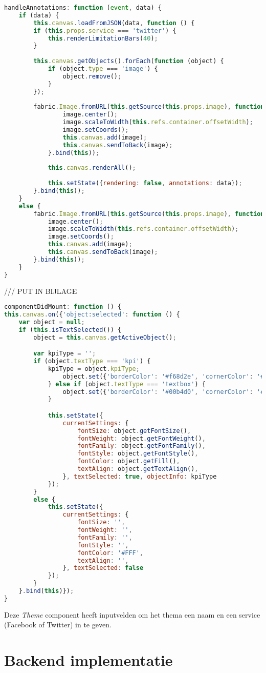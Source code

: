 \begin{lstlisting}[language=javascript]
handleAnnotations: function (event, data) {
	if (data) {
		this.canvas.loadFromJSON(data, function () {
		if (this.props.service === 'twitter') {
			this.renderLimitationBars(40);
		}
		
		this.canvas.getObjects().forEach(function (object) {
			if (object.type === 'image') {
				object.remove();
			}
		});
		
		fabric.Image.fromURL(this.getSource(this.props.image), function (image) {
				image.center();
				image.scaleToWidth(this.refs.container.offsetWidth);
				image.setCoords();
				this.canvas.add(image);
				this.canvas.sendToBack(image);
			}.bind(this));
		
			this.canvas.renderAll();
		
			this.setState({rendering: false, annotations: data});
		}.bind(this));
	}
	else {
		fabric.Image.fromURL(this.getSource(this.props.image), function (image) {
			image.center();
			image.scaleToWidth(this.refs.container.offsetWidth);
			image.setCoords();
			this.canvas.add(image);
			this.canvas.sendToBack(image);
		}.bind(this));
	}
}
\end{lstlisting}

/// PUT IN BIJLAGE
\begin{lstlisting}[language=javascript]
componentDidMount: function () {
this.canvas.on({'object:selected': function () {
	var object = null;
	if (this.isTextSelected()) {
		object = this.canvas.getActiveObject();

		var kpiType = '';
		if (object.textType === 'kpi') {
			kpiType = object.kpiType;
				object.set({'borderColor': '#f68d2e', 'cornerColor': '#f68d2e'});
			} else if (object.textType === 'textbox') {
				object.set({'borderColor': '#00b4d0', 'cornerColor': '#00b4d0'});
			}

			this.setState({
				currentSettings: {
					fontSize: object.getFontSize(),
					fontWeight: object.getFontWeight(),
					fontFamily: object.getFontFamily(),
					fontStyle: object.getFontStyle(),
					fontColor: object.getFill(),
					textAlign: object.getTextAlign(),
				}, textSelected: true, objectInfo: kpiType
			});
		}
		else {
			this.setState({
				currentSettings: {
					fontSize: '',
					fontWeight: '',
					fontFamily: '',
					fontStyle: '',
					fontColor: '#FFF',
					textAlign: '',
				}, textSelected: false
			});
		}
	}.bind(this)});
}
\end{lstlisting}




Deze \textit{Theme} component heeft inputvelden om het thema een naam en een service (Facebook of Twitter) in te geven. 



\section{Backend implementatie}
